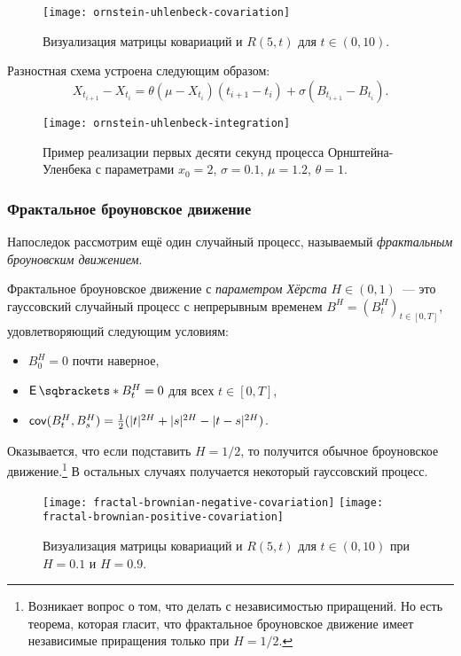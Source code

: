 \begin{figure}[H]
	\hspace{-0.01\textwidth} 
	\centering\texttt{[image: ornstein-uhlenbeck-covariation]}
	\caption{Визуализация матрицы ковариаций и \(R(5, t)\) для \(t \in (0, 
		10)\).}
\end{figure}

Разностная схема устроена следующим образом:
\[
X_{t_{i + 1}} - X_{t_{i}} = \theta(\mu - X_{t_{i}})(t_{i + 1} - t_{i}) + 
\sigma(B_{t_{i + 1}} - B_{t_{i}}).
\]

\begin{figure}[H]
	\centering\texttt{[image: ornstein-uhlenbeck-integration]}
	\caption{Пример реализации первых десяти секунд процесса Орнштейна-Уленбека 
		с параметрами \(x_{0} = 2\), \(\sigma = 0.1\), \(\mu = 1.2\), \(\theta 
		= 
		1\).}
\end{figure}

\subsubsection{Фрактальное броуновское движение}

Напоследок рассмотрим ещё один случайный процесс, называемый \emph{фрактальным 
броуновским движением}.
\begin{definition}
	Фрактальное броуновское движение с \emph{параметром Хёрста} \(H \in (0, 
	1)\)~--- это гауссовский случайный процесс с непрерывным временем 
	\(B^{H} = (B_{t}^{H})_{t \in [0, T]}\), удовлетворяющий следующим условиям:
	\begin{itemize}
		\item \(B^{H}_{0} = 0\) почти наверное,
		\item \(\E{B^{H}_{t}} = 0\) для всех \(t \in [0, T]\),
		\item \(\operatorname{\mathsf{cov}}(B^{H}_{t}, B^{H}_{s}) = \frac{1}{2}(|t|^{2H} + |s|^{2H} - 
		|t - s|^{2H})\).
	\end{itemize}
\end{definition}

Оказывается, что если подставить \(H = 1/2\), то получится обычное броуновское 
движение.\footnote{Возникает вопрос о том, что делать с независимостью 
приращений. Но есть теорема, которая гласит, что фрактальное броуновское 
движение имеет независимые приращения только при \(H = 1/2\).} В остальных 
случаях получается некоторый гауссовский процесс. 
\begin{figure}[H]
	\hspace{-0.01\textwidth} 
	\centering\texttt{[image: fractal-brownian-negative-covariation]}
	\centering\texttt{[image: fractal-brownian-positive-covariation]}
	\caption{Визуализация матрицы ковариаций и \(R(5, t)\) для \(t \in (0, 
		10)\) при \(H = 0.1\) и \(H = 0.9\).}
\end{figure}

